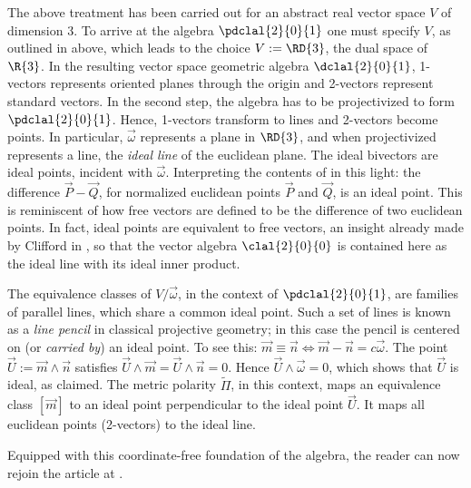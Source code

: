 \documentclass[12pt]{article}
\newcommand{\vsp}{V\xspace}
\begin{document}
The above treatment has been carried out for an abstract real vector space $\vsp$ of dimension 3.  To arrive at the algebra $\pdclal{2}{0}{1}$ one must specify $\vsp$, as outlined in  above, which leads to the choice  $\vsp := \RD{3}$, the dual space of $\R{3}$. In the resulting  vector space geometric algebra $\dclal{2}{0}{1}$, 1-vectors represents oriented planes through the origin and 2-vectors represent standard vectors.  In the second step, the algebra has to be projectivized to form $\pdclal{2}{0}{1}$.   Hence, 1-vectors transform to lines and 2-vectors become points.  In particular, $\vec{\omega}$ represents a plane in $\RD{3}$, and when projectivized represents a line, the \emph{ideal line} of the euclidean plane.   The ideal bivectors are ideal points, incident with $\vec{\omega}$.  Interpreting the contents of  in this light: the difference $\vec{P}-\vec{Q}$, for normalized euclidean points $\vec{P}$ and $\vec{Q}$, is an ideal point.  This is reminiscent of how free vectors are defined to be the difference of two euclidean points. In fact,  ideal points are equivalent to free vectors, an insight already made by Clifford in \cite{clifford73}, so that the vector algebra $\clal{2}{0}{0}$ is contained here as the ideal line with its ideal inner product.  

The equivalence classes of $\vsp/\vec{\omega}$, in the context of $\pdclal{2}{0}{1}$, are families of parallel lines, which share a common ideal point. Such a set of lines is known as a \emph{line pencil} in classical projective geometry; in this case the pencil is centered on (or \emph{carried by}) an ideal point.   To see this:  $\vec{m} \equiv \vec{n} \iff \vec{m} - \vec{n} = c\vec{\omega}$.  The  point $\vec{U} := \vec{m} \wedge \vec{n}$ satisfies $\vec{U} \wedge \vec{m} = \vec{U} \wedge  \vec{n} = 0$.  Hence $\vec{U} \wedge \vec{\omega} = 0$, which shows that $\vec{U}$ is ideal, as claimed.
The metric polarity $\widetilde{\Pi}$,  in this context, maps an equivalence class $[\vec{m}]$ to an ideal point perpendicular to the ideal point $\vec{U}$.  It maps all euclidean points (2-vectors) to the ideal line.

Equipped with this coordinate-free foundation of the algebra, the reader can now rejoin the article at .

\end{document}
